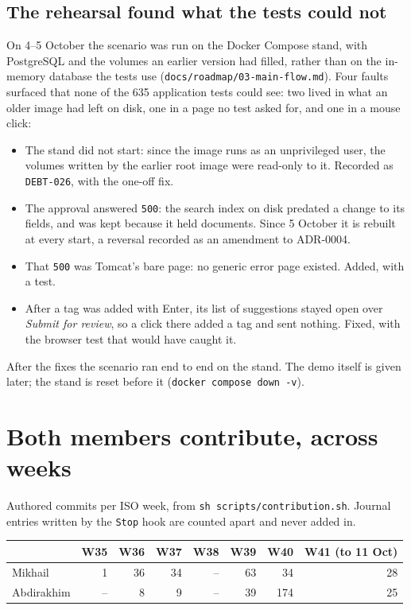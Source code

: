\documentclass[11pt]{article}
\begin{document}
\subsection*{The rehearsal found what the tests could not}

On 4--5 October the scenario was run on the Docker Compose stand, with PostgreSQL and the volumes an
earlier version had filled, rather than on the in-memory database the tests use
(\texttt{docs/roadmap/03-main-flow.md}). Four faults surfaced that none of the 635 application
tests could see: two lived in what an older image had left on disk, one in a page no test asked
for, and one in a mouse click:

\begin{itemize}
\item The stand did not start: since the image runs as an unprivileged user, the volumes written
  by the earlier root image were read-only to it. Recorded as \texttt{DEBT-026}, with the one-off
  fix.
\item The approval answered \texttt{500}: the search index on disk predated a change to its fields,
  and was kept because it held documents. Since 5 October it is rebuilt at every start, a reversal
  recorded as an amendment to ADR-0004.
\item That \texttt{500} was Tomcat's bare page: no generic error page existed. Added, with a test.
\item After a tag was added with Enter, its list of suggestions stayed open over \emph{Submit for
  review}, so a click there added a tag and sent nothing. Fixed, with the browser test that would
  have caught it.
\end{itemize}

After the fixes the scenario ran end to end on the stand. The demo itself is given later; the
stand is reset before it (\texttt{docker compose down -v}).

\section{Both members contribute, across weeks}

Authored commits per ISO week, from \texttt{sh scripts/contribution.sh}. Journal entries written by
the \texttt{Stop} hook are counted apart and never added in.

\noindent\begin{tabular}{@{}lrrrrrrr@{}}
\toprule
& W35 & W36 & W37 & W38 & W39 & W40 & W41 (to 11 Oct) \\
\midrule
Mikhail & 1 & 36 & 34 & -- & 63 & 34 & 28 \\
Abdirakhim & -- & 8 & 9 & -- & 39 & 174 & 25 \\
\bottomrule
\end{tabular}
\end{document}
